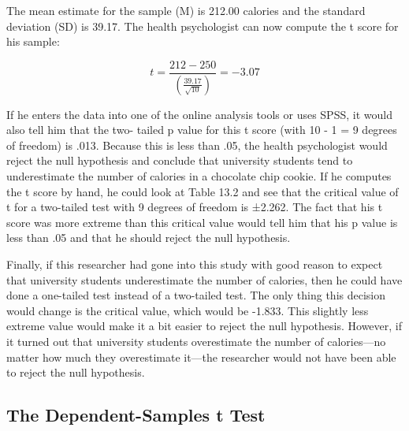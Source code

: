 The mean estimate for the sample (M) is 212.00 calories and the standard deviation (SD) is 39.17. The health psychologist can now compute the t score for his sample:



\begin{equation}
t = \frac{212-250}{\left( \frac{39.17}{\sqrt{10}}\right)} = -3.07
\end{equation}


If he enters the data into one of the online analysis tools or uses SPSS, it would also tell him that the two- tailed p value for this t score (with 10 - 1 = 9 degrees of freedom) is .013. Because this is less than .05, the health psychologist would reject the null hypothesis and conclude that university students tend to underestimate the number of calories in a chocolate chip cookie. If he computes the t score by hand, he could look at Table 13.2 and see that the critical value of t for a two-tailed test with 9 degrees of freedom is ±2.262. The fact that his t score was more extreme than this critical value would tell him that his p value is less than .05 and that he should reject the null hypothesis.


Finally, if this researcher had gone into this study with good reason to expect that university students underestimate the number of calories, then he could have done a one-tailed test instead of a two-tailed test. The only thing this decision would change is the critical value, which would be -1.833. This slightly less extreme value would make it a bit easier to reject the null hypothesis. However, if it turned out that university students overestimate the number of calories---no matter how much they overestimate it---the researcher would not have been able to reject the null hypothesis.


\subsection{The Dependent-Samples t Test}

